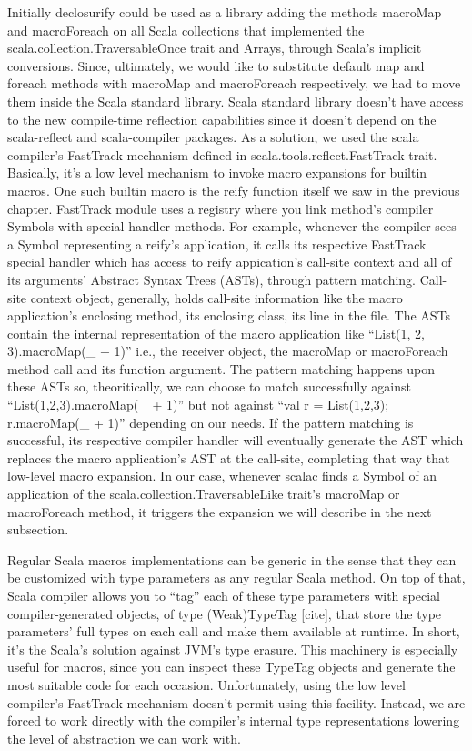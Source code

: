 Initially declosurify could be used as a library adding the methods macroMap
and macroForeach on all Scala collections that implemented the
scala.collection.TraversableOnce trait and Arrays, through Scala's implicit
conversions. Since, ultimately, we would like to substitute default map and
foreach methods with macroMap and macroForeach respectively, we had to move them
inside the Scala standard library. Scala standard library doesn't have access to
the new compile-time reflection capabilities since it doesn't depend on the
scala-reflect and scala-compiler packages. As a solution, we used the scala
compiler's FastTrack mechanism defined in scala.tools.reflect.FastTrack
trait. Basically, it's a low level mechanism to invoke macro expansions for
builtin macros. One such builtin macro is the reify function itself  we saw in
the previous chapter. FastTrack module uses a registry where you link
method's compiler Symbols with special handler methods. For example, whenever
the compiler sees a Symbol representing a reify's application, it calls its
respective FastTrack special handler which has access to reify appication's
call-site context and all of  its arguments' Abstract Syntax Trees (ASTs),
through pattern matching. Call-site context object, generally, holds call-site
information like the macro application's enclosing method, its enclosing class,
its line in the file. The ASTs contain the internal representation of the macro
application like ``List(1, 2, 3).macroMap(_ + 1)'' i.e., the receiver object,
the macroMap or macroForeach method call and its function argument. The pattern
matching happens upon these ASTs so, theoritically, we can choose to match
successfully against ``List(1,2,3).macroMap(_ + 1)'' but not against ``val r =
List(1,2,3); r.macroMap(_ + 1)'' depending on our needs. If the pattern matching
is successful, its respective compiler handler will eventually generate the AST
which replaces the macro application's AST at the call-site, completing that way
that low-level macro expansion. In our case, whenever scalac finds a Symbol of
an application of the scala.collection.TraversableLike trait's macroMap or
macroForeach method, it triggers the expansion we will describe in the next
subsection.

Regular Scala macros implementations can be generic in the sense that they can
be customized with type parameters as any regular Scala method. On top of that,
Scala compiler allows you to ``tag'' each of these type parameters with special
compiler-generated objects, of type (Weak)TypeTag [cite], that store the type
parameters' full types on each call and make them available at runtime. In
short, it's the Scala's solution against JVM's type erasure. This machinery is
especially useful for macros, since you can inspect these TypeTag objects and
generate the most suitable code for each occasion. Unfortunately, using the low
level compiler's FastTrack mechanism doesn't permit using this facility.
Instead, we are forced to work directly with the compiler's internal type
representations lowering the level of abstraction we can work with.

